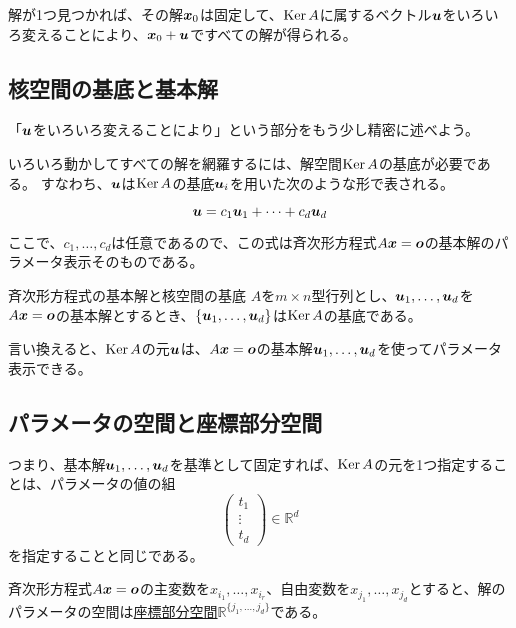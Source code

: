 \documentclass[../../../topic_linear-algebra]{subfiles}
\begin{document}
\br

解が1つ見つかれば、その解$\vb*{x}_0$は固定して、$\operatorname{Ker} A$に属するベクトル$\vb*{u}$をいろいろ変えることにより、$\vb*{x}_0 + \vb*{u}$ですべての解が得られる。

\subsection{核空間の基底と基本解}

「$\vb*{u}$をいろいろ変えることにより」という部分をもう少し精密に述べよう。

いろいろ動かしてすべての解を網羅するには、解空間$\operatorname{Ker} A$の基底が必要である。
すなわち、$\vb*{u}$は$\operatorname{Ker} A$の基底$\vb*{u}_i$を用いた次のような形で表される。

\begin{equation*}
  \vb*{u} = c_1 \vb*{u}_1 + \cdots + c_d \vb*{u}_d
\end{equation*}

ここで、$c_1, \ldots, c_d$は任意であるので、この式は斉次形方程式$A\vb*{x} = \vb*{o}$の基本解のパラメータ表示そのものである。

\begin{theorem}{斉次形方程式の基本解と核空間の基底}
  $A$を$m \times n$型行列とし、$\vb*{u}_1, \dots, \vb*{u}_d$を$A\vb*{x} = \vb*{o}$の基本解とするとき、$\{ \vb*{u}_1, \dots, \vb*{u}_d \}$は$\operatorname{Ker} A$の基底である。
\end{theorem}

言い換えると、$\operatorname{Ker} A$の元$\vb*{u}$は、$A\vb*{x} = \vb*{o}$の基本解$\vb*{u}_1,\dots,\vb*{u}_d$を使ってパラメータ表示できる。

\subsection{パラメータの空間と座標部分空間}

つまり、基本解$\vb*{u}_1, \dots, \vb*{u}_d$を基準として固定すれば、$\operatorname{Ker} A$の元を1つ指定することは、パラメータの値の組
\begin{equation*}
  \begin{pmatrix}
    t_1    \\
    \vdots \\
    t_d
  \end{pmatrix} \in \mathbb{R}^d
\end{equation*}
を指定することと同じである。

\br

斉次形方程式$A\vb*{x} = \vb*{o}$の主変数を$x_{i_1}, \dots, x_{i_r}$、自由変数を$x_{j_1}, \dots, x_{j_d}$とすると、解のパラメータの空間は\hyperref[def:coordinate-subspace]{座標部分空間}$\mathbb{R}^{\{ j_1, \dots, j_d \}}$である。
\end{document}

